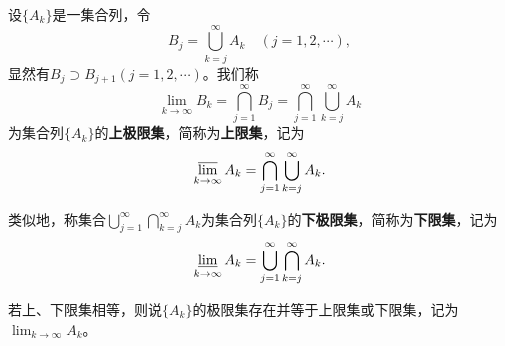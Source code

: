 \documentclass[../../main.tex]{subfiles}%
\begin{document}
\begin{definition}[上、下极限集]\label{definition:上、下极限集}
  设\(\{A_k\}\)是一集合列，令
\[B_j=\bigcup_{k = j}^{\infty}A_k\quad (j = 1,2,\cdots),\]
显然有\(B_j\supset B_{j + 1}(j = 1,2,\cdots)\)。我们称
\[\lim_{k\rightarrow\infty}B_k=\bigcap_{j = 1}^{\infty}B_j=\bigcap_{j = 1}^{\infty}\bigcup_{k = j}^{\infty}A_k\]
为集合列\(\{A_k\}\)的\textbf{上极限集}，简称为\textbf{上限集}，记为
\[\varlimsup_{k\rightarrow\infty}A_k=\bigcap_{j = 1}^{\infty}\bigcup_{k = j}^{\infty}A_k.\]

类似地，称集合\(\bigcup_{j = 1}^{\infty}\bigcap_{k = j}^{\infty}A_k\)为集合列\(\{A_k\}\)的\textbf{下极限集}，简称为\textbf{下限集}，记为
\[\varliminf_{k\rightarrow\infty}A_k=\bigcup_{j = 1}^{\infty}\bigcap_{k = j}^{\infty}A_k.\]

若上、下限集相等，则说\(\{A_k\}\)的极限集存在并等于上限集或下限集，记为\(\lim_{k\rightarrow\infty}A_k\)。
\end{definition}
\end{document}
